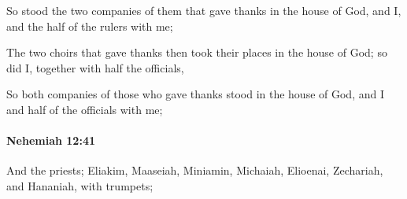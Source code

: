 			\begin{versebox}
					\item[BHS] 
					\item[ASV] So stood the two companies of them that gave thanks in the house of God, and I, and the half of the rulers with me;
					\item[NIV] The two choirs that gave thanks then took their places in the house of God; so did I, together with half the officials,
					\item[NRSV] So both companies of those who gave thanks stood in the house of God, and I and half of the officials with me;
			\end{versebox}

		\paragraph{Nehemiah 12:41} %
			\label{NEHEMIAH-12-41}

			And the priests; Eliakim, Maaseiah, Miniamin, Michaiah, Elioenai, Zechariah, and Hananiah, with trumpets;


